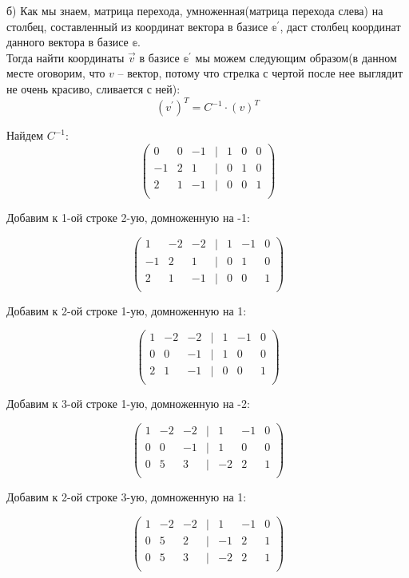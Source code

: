 	б) 
	Как мы знаем, матрица перехода, умноженная(матрица перехода слева) на столбец, составленный из координат вектора в базисе $\mathbb{e}^\prime$, даст столбец координат данного вектора в базисе $\mathbb{e}$. \\
	Тогда найти координаты $\vec v$ в базисе $\mathbb{e}^\prime$ мы можем следующим образом(в данном месте оговорим, что $v$ -- вектор, потому что стрелка с чертой после нее выглядит не очень красиво, сливается с ней): 
	\[
		 (v^{\prime})^T = C^{-1} \cdot (v)^T
	\]
	
	Найдем $C^{-1}$:
	\[
	\begin{pmatrix}
	0 & 0 & -1 & | & 1 & 0 & 0 \\
	-1 & 2 & 1 & | & 0 & 1 & 0 \\
	2 & 1 & -1 & | & 0 & 0 & 1 \\
	\end{pmatrix}
	\]
	
	Добавим к 1-ой строке 2-ую, домноженную на -1:
	
	\[
	\begin{pmatrix}
	1 & -2 & -2 & | & 1 & -1 & 0 \\
	-1 & 2 & 1 & | & 0 & 1 & 0 \\
	2 & 1 & -1 & | & 0 & 0 & 1 \\
	\end{pmatrix}
	\]
	
	Добавим к 2-ой строке 1-ую, домноженную на 1:
	
	\[
	\begin{pmatrix}
	1 & -2 & -2 & | & 1 & -1 & 0 \\
	0 & 0 & -1 & | & 1 & 0 & 0 \\
	2 & 1 & -1 & | & 0 & 0 & 1 \\
	\end{pmatrix}
	\]
	
	Добавим к 3-ой строке 1-ую, домноженную на -2:
	
	\[
	\begin{pmatrix}
	1 & -2 & -2 & | & 1 & -1 & 0 \\
	0 & 0 & -1 & | & 1 & 0 & 0 \\
	0 & 5 & 3 & | & -2 & 2 & 1 \\
	\end{pmatrix}
	\]
	
	Добавим к 2-ой строке 3-ую, домноженную на 1:
	
	\[
	\begin{pmatrix}
	1 & -2 & -2 & | & 1 & -1 & 0 \\
	0 & 5 & 2 & | & -1 & 2 & 1 \\
	0 & 5 & 3 & | & -2 & 2 & 1 \\
	\end{pmatrix}
	\]
	
